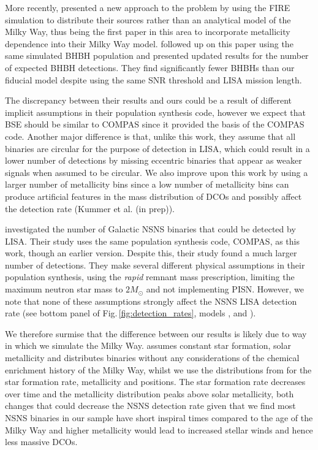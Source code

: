 More recently, \citet{Lamberts+2018} presented a new approach to the problem by using the FIRE simulation \citep{Hopkins+2014} to distribute their sources rather than an analytical model of the Milky Way, thus being the first paper in this area to incorporate metallicity dependence into their Milky Way model. \citet{Sesana+2020} followed up on this paper using the same simulated BHBH population and presented updated results for the number of expected BHBH detections. They find significantly fewer BHBHs than our fiducial model despite using the same SNR threshold and LISA mission length.

The discrepancy between their results and ours could be a result of different implicit assumptions in their population synthesis code, however we expect that BSE should be similar to COMPAS since it provided the basis of the COMPAS code. Another major difference is that, unlike this work, they assume that all binaries are circular for the purpose of detection in LISA, which could result in a lower number of detections by missing eccentric binaries that appear as weaker signals when assumed to be circular. We also improve upon this work by using a larger number of metallicity bins since a low number of metallicity bins can produce artificial features in the mass distribution of DCOs and possibly affect the detection rate (Kummer et al. (in prep)).

\citet{Lau+2020} investigated the number of Galactic NSNS binaries that could be detected by LISA. Their study uses the same population synthesis code, COMPAS, as this work, though an earlier version. Despite this, their study found a much larger number of detections. They make several different physical assumptions in their population synthesis, using the \citet{Fryer+2012} \textit{rapid} remnant mass prescription, limiting the maximum neutron star mass to $2 \unit{M_{\odot}}$ and not implementing PISN. However, we note that none of these assumptions strongly affect the NSNS LISA detection rate (see bottom panel of Fig.\,\ref{fig:detection_rates}, models \modRapid{}, \modNSLow{} and \modNoPISN{}).

We therefore surmise that the difference between our results is likely due to way in which we simulate the Milky Way. \citet{Lau+2020} assumes constant star formation, solar metallicity and distributes binaries without any considerations of the chemical enrichment history of the Milky Way, whilst we use the distributions from \citet{Frankel+2018} for the star formation rate, metallicity and positions. The \citet{Frankel+2018} star formation rate decreases over time and the metallicity distribution peaks above solar metallicity, both changes that could decrease the NSNS detection rate given that we find most NSNS binaries in our sample have short inspiral times compared to the age of the Milky Way and higher metallicity would lead to increased stellar winds and hence less massive DCOs.

